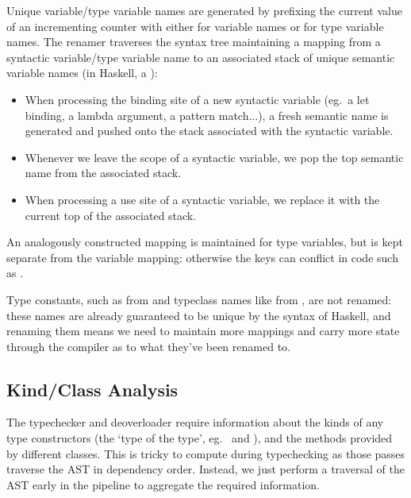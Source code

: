 \documentclass[dissertation.tex]{subfiles}
\begin{document}
{{        Unique variable/type variable names are generated by prefixing the current value of an incrementing counter with
        either  for variable names or  for type variable names. The renamer traverses the syntax
        tree maintaining a mapping from a syntactic variable/type variable name to an associated stack of unique
        semantic variable names (in Haskell, a ):

        \begin{itemize}
        \item When processing the binding site of a new syntactic variable (eg.\ a let binding, a lambda argument, a
        pattern match...), a fresh semantic name is generated and pushed onto the stack associated with the syntactic
        variable.
        \item Whenever we leave the scope of a syntactic variable, we pop the top semantic name from the associated
        stack.
        \item When processing a use site of a syntactic variable, we replace it with the current top of the
        associated stack.
        \end{itemize}

        An analogously constructed mapping is maintained for type variables, but is kept separate from the variable
        mapping: otherwise the keys can conflict in code such as .

        Type constants, such as  from  and typeclass names like
         from , are not renamed: these names are already guaranteed to be
        unique by the syntax of Haskell, and renaming them means we need to maintain more mappings and carry more state
        through the compiler as to what they've been renamed to.

    }
    \subsection{Kind/Class Analysis}
    {

        The typechecker and deoverloader require information about the kinds of any type constructors (the `type of the
        type', eg.\  and ), and the methods provided by different classes.
        This is tricky to compute during typechecking as those passes traverse the AST in dependency order. Instead, we
        just perform a traversal of the AST early in the pipeline to aggregate the required information.

}}
\end{document}
